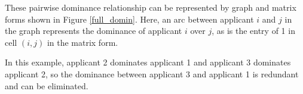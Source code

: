 \documentclass[12pt,english]{report}
\begin{document}
These pairwise dominance relationship can be represented by graph and matrix forms shown in Figure \ref{full_domin}. Here, an arc between applicant $i$ and $j$ in the graph represents the dominance of applicant $i$ over $j$,  as is the entry of 1 in cell $(i,j)$ in the matrix form.


\begin{figure}
    \begin{floatrow}
    \capbtabbox{%
        \begin{tabular}{l|llllll}
            & 1 & 2 & 3 & 4 & 5 & 6 \\ \hline
            1 & 0 & 0 & 0 & 0 & 0 & 0 \\
            2 & 1 & 0 & 0 & 1 & 1 & 0 \\
            3 & 1 & 1 & 0 & 1 & 1 & 0 \\
            4 & 0 & 0 & 0 & 0 & 0 & 0 \\
            5 & 0 & 0 & 0 & 0 & 0 & 0 \\
            6 & 1 & 1 & 0 & 1 & 1 & 0 \\
        \end{tabular}%
    }{%
    \caption{Full dominance relation in matrix form}%
    \label{full_domin}
}
\end{floatrow}
\end{figure}


In this example, applicant 2 dominates applicant 1 and applicant 3 dominates applicant 2, so the dominance between applicant 3 and applicant 1 is redundant and can be eliminated.
\end{document}
